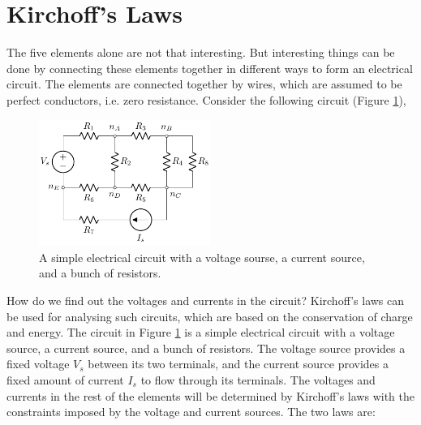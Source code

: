 \section{Kirchoff's Laws}
The five elements alone are not that interesting. But interesting things can be done by connecting these elements together in different ways to form an electrical circuit. The elements are connected together by wires, which are assumed to be perfect conductors, i.e. zero resistance. Consider the following circuit (Figure \ref{fig:02-02}),
\begin{figure}[t]
    \centering
    \includegraphics[width=0.5\textwidth]{figure/ch02/fig02-02.pdf}
    \caption{A simple electrical circuit with a voltage sourse, a current source, and a bunch of resistors.}
    \label{fig:02-02}
\end{figure}

How do we find out the voltages and currents in the circuit? Kirchoff's laws can be used for analysing such circuits, which are based on the conservation of charge and energy. The circuit in Figure \ref{fig:02-02} is a simple electrical circuit with a voltage source, a current source, and a bunch of resistors. The voltage source provides a fixed voltage $V_s$ between its two terminals, and the current source provides a fixed amount of current $I_s$ to flow through its terminals. The voltages and currents in the rest of the elements will be determined by Kirchoff's laws with the constraints imposed by the voltage and current sources. The two laws are:

